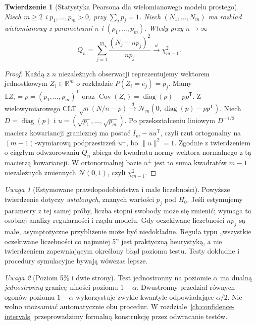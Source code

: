 \documentclass[11pt,a4paper,oneside]{report}
\numberwithin{equation}{chapter}
\theoremstyle{plain}
\newtheorem{twierdzenie}{Twierdzenie}[chapter]
\theoremstyle{definition}
\theoremstyle{remark}
\newtheorem{uwaga}{Uwaga}[chapter]
\newcommand{\R}{\mathbb R}
\newcommand{\E}{\mathbb E}
\newcommand{\Cov}{\operatorname{Cov}}
\newcommand{\Normal}{\mathcal N}
\DeclareMathOperator{\diag}{diag}
\begin{document}
\begin{twierdzenie}[Statystyka Pearsona dla wielomianowego modelu prostego]
\label{thm:pearson-chi-square}
Niech $m\ge2$ i $p_1,\ldots,p_m>0$, przy
$\sum_jp_j=1$. Niech $(N_1,\ldots,N_m)$ ma rozkład
wielomianowy z parametrami $n$ i
$(p_1,\ldots,p_m)$. Wtedy przy $n\to\infty$
\[
 Q_n=\sum_{j=1}^m\frac{(N_j-np_j)^2}{np_j}
 \xrightarrow{d}\chi^2_{m-1}.
\]
\end{twierdzenie}
\begin{proof}
Każdą z $n$ niezależnych obserwacji reprezentujemy wektorem
jednostkowym $Z_i\in\R^m$ o rozkładzie
$P(Z_i=e_j)=p_j$. Mamy
$\E Z_i=p=(p_1,\ldots,p_m)^{\mathsf T}$ oraz
$\Cov(Z_i)=\diag(p)-pp^{\mathsf T}$.
Z wielowymiarowego CLT
$\sqrt n(N/n-p)\xrightarrow{d}\Normal_m(0,
\diag(p)-pp^{\mathsf T})$.
Niech $D=\diag(p)$ i $u=(\sqrt{p_1},\ldots,\sqrt{p_m})$.
Po przekształceniu liniowym $D^{-1/2}$ macierz
kowariancji granicznej ma postać
$I_m-uu^{\mathsf T}$, czyli rzut ortogonalny na
$(m-1)$-wymiarową podprzestrzeń $u^\perp$, bo
$\|u\|^2=1$. Zgodnie z twierdzeniem o ciągłym
odwzorowaniu $Q_n$ zbiega do kwadratu normy wektora
normalnego z tą macierzą kowariancji. W ortonormalnej
bazie $u^\perp$ jest to suma kwadratów $m-1$
niezależnych zmiennych $\Normal(0,1)$, czyli
$\chi^2_{m-1}$.
\end{proof}

\begin{uwaga}[Estymowane prawdopodobieństwa i małe liczebności]
Powyższe twierdzenie dotyczy \emph{ustalonych}, znanych
wartości $p_j$ pod $H_0$. Jeśli estymujemy parametry z tej
samej próby, liczba stopni swobody może się zmienić; wymaga
to osobnej analizy regularności i rzędu modelu.
Gdy oczekiwane liczebności $np_j$ są małe, asymptotyczne
przybliżenie może być niedokładne. Reguła typu
„wszystkie oczekiwane liczebności co najmniej 5” jest
praktyczną heurystyką, a nie twierdzeniem zapewniającym
określony błąd poziomu testu. Testy dokładne i procedury
symulacyjne bywają wówczas lepsze.
\end{uwaga}

\begin{uwaga}[Poziom 5\% i dwie strony]
Test jednostronny na poziomie $\alpha$ ma dualną
\emph{jednostronną} granicę ufności poziomu $1-\alpha$.
Dwustronny przedział równych ogonów poziomu $1-\alpha$
wykorzystuje zwykle kwantyle odpowiadające $\alpha/2$.
Nie wolno utożsamiać automatycznie obu procedur. W
rozdziale~\ref{ch:confidence-intervals} przeprowadzimy
formalną konstrukcję przez odwracanie testów.
\end{uwaga}
\end{document}
